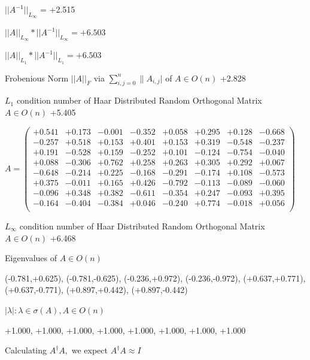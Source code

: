 \documentclass[9pt]{article}
\theoremstyle{plain}
\theoremstyle{definition}
\theoremstyle{remark}
\numberwithin{equation}{section}
\begin{document}
$||A^{-1}||_{L_{\infty}}$ = +2.515

$||A||_{L_{\infty}} * ||A^{-1}||_{L_{\infty}} = +6.503$

$||A||_{L_1} * ||A^{-1}||_{L_1} = +6.503$

Frobenious Norm  $||A||_{\textit{F}}$ via $\sum\limits_{i,j =0}^{n} \|A_{i,j}|$   of  $A \in O(n)$  +2.828

$L_1$ condition number of Haar Distributed Random Orthogonal Matrix $A \in O(n)$ +5.405

$A = \left(
\begin{array}{
cccccccc}
+0.541 & +0.173 & -0.001 & -0.352 & +0.058 & +0.295 & +0.128 & -0.668 \\
-0.257 & +0.518 & +0.153 & +0.401 & +0.153 & +0.319 & -0.548 & -0.237 \\
+0.191 & -0.528 & +0.159 & -0.252 & +0.101 & -0.124 & -0.754 & -0.040 \\
+0.088 & -0.306 & +0.762 & +0.258 & +0.263 & +0.305 & +0.292 & +0.067 \\
-0.648 & -0.214 & +0.225 & -0.168 & -0.291 & -0.174 & +0.108 & -0.573 \\
+0.375 & -0.011 & +0.165 & +0.426 & -0.792 & -0.113 & -0.089 & -0.060 \\
-0.096 & +0.348 & +0.382 & -0.611 & -0.354 & +0.247 & -0.093 & +0.395 \\
-0.164 & -0.404 & -0.384 & +0.046 & -0.240 & +0.774 & -0.018 & +0.056 \\
\end{array}
\right)$ \newline 

$L_{\infty}$ condition number of Haar Distributed Random Orthogonal Matrix $A \in O(n)$ +6.468

Eigenvalues of $A \in O(n)$

(-0.781,+0.625), (-0.781,-0.625), (-0.236,+0.972), (-0.236,-0.972), (+0.637,+0.771), (+0.637,-0.771), (+0.897,+0.442), (+0.897,-0.442)

 $|\lambda | : \lambda \in \sigma(A) , A \in O(n)$

+1.000, +1.000, +1.000, +1.000, +1.000, +1.000, +1.000, +1.000


Calculating $A^{\dag} A,$  we expect $A^{\dag} A \approx I$
\end{document}
